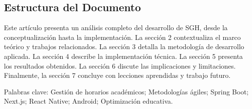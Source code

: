 \subsection{Estructura del Documento}

Este artículo presenta un análisis completo del desarrollo de SGH, desde la conceptualización hasta la implementación. La sección 2 contextualiza el marco teórico y trabajos relacionados. La sección 3 detalla la metodología de desarrollo aplicada. La sección 4 describe la implementación técnica. La sección 5 presenta los resultados obtenidos. La sección 6 discute las implicaciones y limitaciones. Finalmente, la sección 7 concluye con lecciones aprendidas y trabajo futuro.

Palabras clave: Gestión de horarios académicos; Metodologías ágiles; Spring Boot; Next.js; React Native; Android; Optimización educativa.